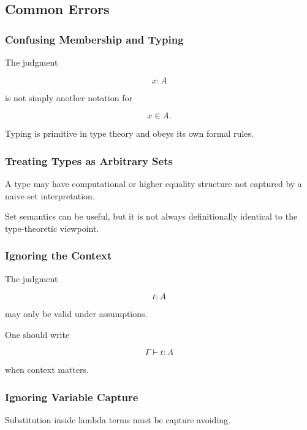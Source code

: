 \subsection{Common Errors}
\label{subsec:type-theory-common-errors}

\subsubsection{Confusing Membership and Typing}

The judgment

\[
x:A
\]

is not simply another notation for

\[
x\in A.
\]

Typing is primitive in type theory and obeys its own formal rules.

\subsubsection{Treating Types as Arbitrary Sets}

A type may have computational or higher equality structure not captured by
a naive set interpretation.

Set semantics can be useful, but it is not always definitionally identical
to the type-theoretic viewpoint.

\subsubsection{Ignoring the Context}

The judgment

\[
t:A
\]

may only be valid under assumptions.

One should write

\[
\boxed{
\Gamma\vdash t:A
}
\]

when context matters.

\subsubsection{Ignoring Variable Capture}

Substitution inside lambda terms must be capture avoiding.


